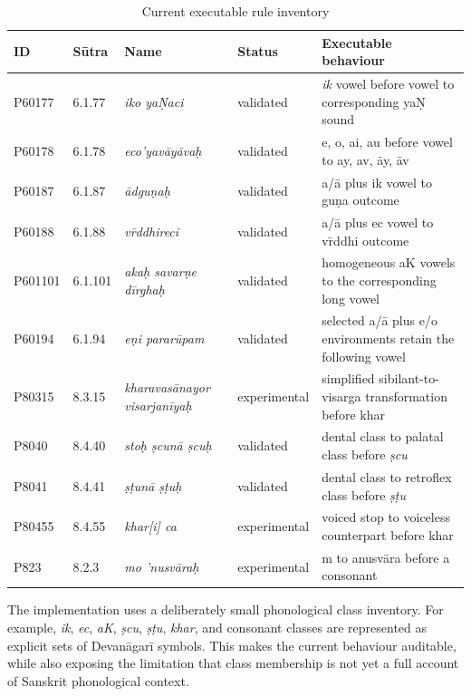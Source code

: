 \documentclass[conference]{IEEEtran}
\begin{document}
\begin{table}[t]
\caption{Current executable rule inventory}
\label{tab:rules}
\centering
\small
\begin{tabular}{llllp{7.2cm}}
\toprule
ID & S\=utra & Name & Status & Executable behaviour \\
\midrule
P60177 & 6.1.77 & \textit{iko ya\d{N}aci} & validated & \textit{ik} vowel before vowel to corresponding ya\d{N} sound \\
P60178 & 6.1.78 & \textit{eco'yav\=ay\=ava\d{h}} & validated & e, o, ai, au before vowel to ay, av, \=ay, \=av \\
P60187 & 6.1.87 & \textit{\=adgu\d{n}a\d{h}} & validated & a/\=a plus ik vowel to gu\d{n}a outcome \\
P60188 & 6.1.88 & \textit{v\=rddhireci} & validated & a/\=a plus ec vowel to v\=rddhi outcome \\
P601101 & 6.1.101 & \textit{aka\d{h} savar\d{n}e d\=irgha\d{h}} & validated & homogeneous aK vowels to the corresponding long vowel \\
P60194 & 6.1.94 & \textit{e\d{n}i parar\=upam} & validated & selected a/\=a plus e/o environments retain the following vowel \\
P80315 & 8.3.15 & \textit{kharavas\=anayor visarjan\=iya\d{h}} & experimental & simplified sibilant-to-visarga transformation before khar \\
P8040 & 8.4.40 & \textit{sto\d{h} \d{s}cun\=a \d{s}cu\d{h}} & validated & dental class to palatal class before \textit{\d{s}cu} \\
P8041 & 8.4.41 & \textit{\d{s}\d{t}un\=a \d{s}\d{t}u\d{h}} & validated & dental class to retroflex class before \textit{\d{s}\d{t}u} \\
P80455 & 8.4.55 & \textit{khar[i] ca} & experimental & voiced stop to voiceless counterpart before khar \\
P823 & 8.2.3 & \textit{mo 'nusv\=ara\d{h}} & experimental & m to anusv\=ara before a consonant \\
\bottomrule
\end{tabular}
\end{table}

The implementation uses a deliberately small phonological class inventory. For example, \textit{ik}, \textit{ec}, \textit{aK}, \textit{\d{s}cu}, \textit{\d{s}\d{t}u}, \textit{khar}, and consonant classes are represented as explicit sets of Devan\=agar\=i symbols. This makes the current behaviour auditable, while also exposing the limitation that class membership is not yet a full account of Sanskrit phonological context.
\end{document}
